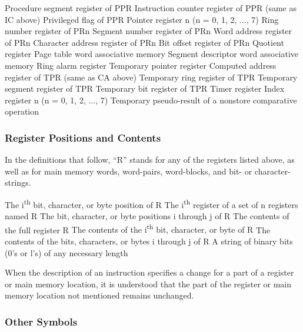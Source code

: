 {
{Procedure segment register of PPR}
{Instruction counter register of PPR (same as IC above)}
{Privileged flag of PPR}
{Pointer register n (n = 0, 1, 2, ..., 7)}
{Ring number register of PRn}
{Segment number register of PRn}
{Word address register of PRn}
{Character address register of PRn}
{Bit offset register of PRn}
{Quotient register}
{Page table word associative memory}
{Segment descriptor word associative memory}
{Ring alarm register}
{Temporary pointer register}
{Computed address register of TPR (same as CA above)}
{Temporary ring register of TPR}
{Temporary segment register of TPR}
{Temporary bit register of TPR}
{Timer register}
{Index register n (n = 0, 1, 2, ..., 7)}
{Temporary pseudo-result of a nonstore comparative operation}

\subsubsection{Register Positions and Contents}

In the definitions that follow, {``}R'' stands for any of the registers listed above, as well as for
main memory words, word-pairs, word-blocks, and bit- or character-strings.

{The i\textsuperscript{th} bit, character, or byte position of R}
{The i\textsuperscript{th} register of a set of n registers named R}
{The bit, character, or byte positions i through j of R}
{The contents of the full register R}
{The contents of the i\textsuperscript{th} bit, character, or byte of R}
{The contents of the bits, characters, or bytes i through j of R}
{A string of binary bits (0's or l's) of any necessary length}

When the description of an instruction specifies a change for a part of a register or main
memory location, it is understood that the part of the register or main memory location not
mentioned remains unchanged.

\subsubsection{Other Symbols}

}
